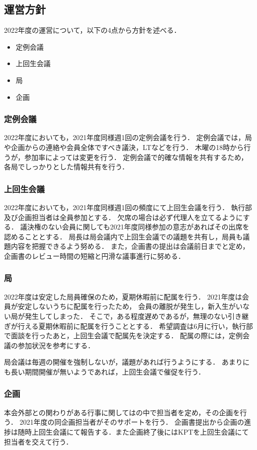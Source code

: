\subsection*{運営方針}


2022年度の運営について，以下の4点から方針を述べる．
\begin{itemize}
    \item 定例会議
    \item 上回生会議
    \item 局
    \item 企画
\end{itemize}

\subsubsection*{定例会議}
2022年度においても，2021年度同様週1回の定例会議を行う．
定例会議では，局や企画からの連絡や会員全体ですべき議決，LTなどを行う．
木曜の18時から行うが，参加率によっては変更を行う．
定例会議で的確な情報を共有するため，各局でしっかりとした情報共有を行う．

\subsubsection*{上回生会議}
2022年度においても，2021年度同様週1回の頻度にて上回生会議を行う．
執行部及び企画担当者は全員参加とする．
欠席の場合は必ず代理人を立てるようにする．
議決権のない会員に関しても2021年度同様参加の意志があればその出席を認めることとする．
局長は局会議内で上回生会議での議題を共有し，局員も議題内容を把握できるよう努める．
また，企画書の提出は会議前日までと定め，企画書のレビュー時間の短縮と円滑な議事進行に努める．

\subsubsection*{局}
2022年度は安定した局員確保のため，夏期休暇前に配属を行う．
2021年度は会員が安定しないうちに配属を行ったため，
会員の離脱が発生し，新入生がいない局が発生してしまった．
そこで，ある程度遅めであるが，無理のない引き継ぎが行える夏期休暇前に配属を行うこととする．
希望調査は6月に行い，執行部で面談を行ったあと，上回生会議で配属先を決定する．
配属の際には，定例会議の参加状況を参考にする．

局会議は毎週の開催を強制しないが，議題があれば行うようにする．
あまりにも長い期間開催が無いようであれば，上回生会議で催促を行う．

\subsubsection*{企画}
本会外部との関わりがある行事に関しては\secondGrade{}の中で担当者を定め，その企画を行う．
2021年度の同企画担当者がそのサポートを行う．
企画書提出から企画の進捗は随時上回生会議にて報告する．また企画終了後にはKPTを上回生会議にて担当者を交えて行う．
